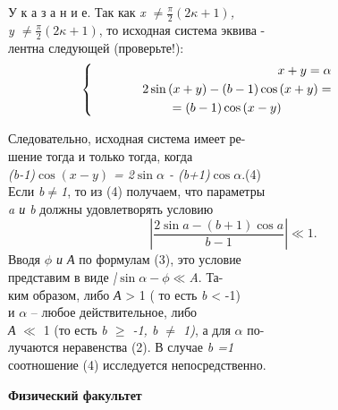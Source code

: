 \begin{minipage}[b]{0.60\textwidth}
	\normalsize \qquad\qquad \quad У к а з а н и е. Так как \textit{x $\neq \frac{\pi}{2}(2\kappa+1)$,\\
	\hphantom\qquad\qquad y $\neq \frac{\pi}{2}(2\kappa+1)$}, то исходная система эквива -\\
	\hphantom\qquad\qquad лентна следующей (проверьте!):\\
	\hphantom\qquad\qquad \[\left\{
	\hphantom\qquad\qquad \begin{aligned}
	x + y =\alpha\\
	2\sin{(x+y)}-(b-1)\cos{(x+y)} =\\
	= (b-1) \cos{(x-y)}
	\hphantom\qquad\qquad  \end{aligned}\right.
	\hphantom\qquad\qquad \]

	\hphantom\qquad\qquad Следовательно, исходная система имеет ре-\\
	\hphantom\qquad\qquad шение тогда и только тогда, когда\\
	\hphantom\qquad\qquad \textit{(b-1)$\cos{(x-y)}$ = 2$\sin{\alpha}$ - (b+1)$\cos{\alpha}$}.(4)\\
	\hphantom\qquad\qquad Если \textit{b$\neq$1}, то из (4) получаем, что параметры\\
	\hphantom\qquad\qquad \textit{a и b} должны удовлетворять условию\\
	\begin{equation*}
		|\frac{2\sin{a}-(b+1)\cos{a}}{b-1}| \ll 1.
	\end{equation*}
	\hphantom\qquad\qquad Вводя \textit{$\phi$ и А} по формулам (3), это условие\\
	\hphantom\qquad\qquad представим в виде \textit{|$\sin{\alpha - \phi}\ll$A}. Та-\\
	\hphantom\qquad\qquad ким образом, либо\textit{ А} > 1 ( то есть \textit{b} < -1)\\
	\hphantom\qquad\qquad и \textit{$\alpha$} -- любое действительное, либо \\
	\hphantom\qquad\qquad \textit{А} $\ll$ 1  (то есть \textit{b $\geq$ -1, b $\neq$ 1)}, а для \textit{$\alpha$} по-\\
	\hphantom\qquad\qquad лучаются неравенства (2). В случае \textit{b =1} \\
	\hphantom\qquad\qquad соотношение (4) исследуется непосредственно.
	
	\begin{center}
		\textbf{Физический факультет}\\
	\end{center}


\end{minipage}
